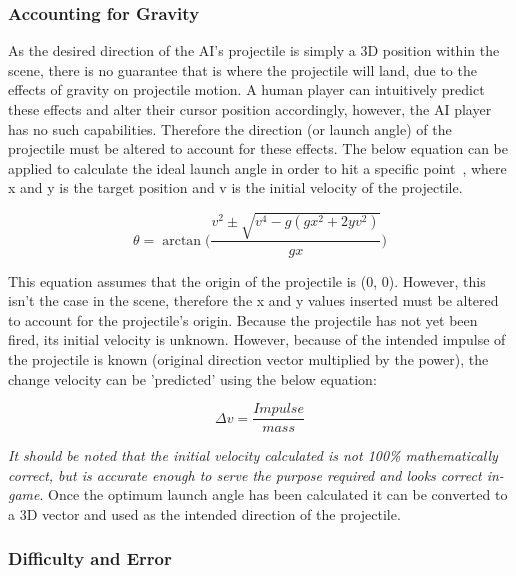 \documentclass[runningheads]{llncs}
\begin{document}
	\subsubsection{Accounting for Gravity}
	As the desired direction of the AI's projectile is simply a 3D position within the scene, there is no guarantee that is where the projectile will land, due to the effects of gravity on projectile motion. A human player can intuitively predict these effects and alter their cursor position accordingly, however, the AI player has no such capabilities. Therefore the direction (or launch angle) of the projectile must be altered to account for these effects. The below equation can be applied to calculate the ideal launch angle in order to hit a specific point~\cite{ref_projectile-motion}, where x and y is the target position and v is the initial velocity of the projectile. 
	
	\begin{equation}
		\theta = \arctan\Bigg(\frac{v^2 \pm \sqrt{v^4 - g(gx^2+2yv^2)}}{gx}\Bigg)
	\end{equation}
	
	This equation assumes that the origin of the projectile is (0, 0). However, this isn't the case in the scene, therefore the x and y values inserted must be altered to account for the projectile's origin. Because the projectile has not yet been fired, its initial velocity is unknown. However, because of the intended impulse of the projectile is known (original direction vector multiplied by the power), the change velocity can be 'predicted' using the below equation:
	
	\begin{equation}
		\Delta v = \frac{Impulse}{mass}
	\end{equation}
	
	\textit{It should be noted that the initial velocity calculated is not 100\% mathematically correct, but is accurate enough to serve the purpose required and looks correct in-game}. Once the optimum launch angle has been calculated it can be converted to a 3D vector and used as the intended direction of the projectile.
	
	\subsubsection{Difficulty and Error}
	
\end{document}
